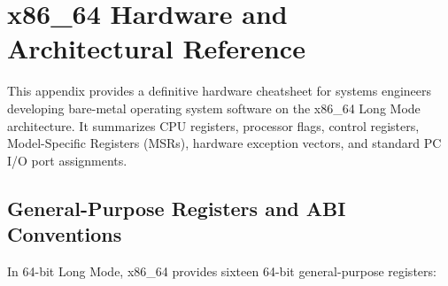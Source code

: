 \chapter{x86\_64 Hardware and Architectural Reference}
\label{app:hardware}

This appendix provides a definitive hardware cheatsheet for systems engineers developing bare-metal operating system software on the x86\_64 Long Mode architecture. It summarizes CPU registers, processor flags, control registers, Model-Specific Registers (MSRs), hardware exception vectors, and standard PC I/O port assignments.

\section{General-Purpose Registers and ABI Conventions}
\label{sec:gpr_cheatsheet}

In 64-bit Long Mode, x86\_64 provides sixteen 64-bit general-purpose registers:

